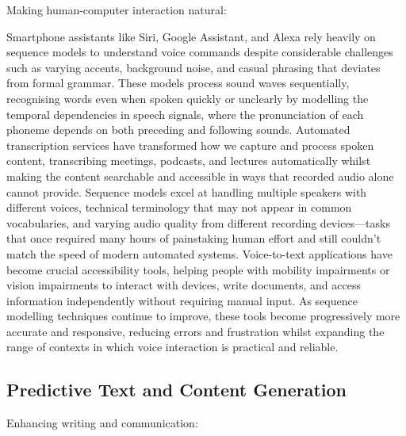 Making human-computer interaction natural:

Smartphone assistants like Siri, Google Assistant, and Alexa rely heavily on sequence models to understand voice commands despite considerable challenges such as varying accents, background noise, and casual phrasing that deviates from formal grammar. These models process sound waves sequentially, recognising words even when spoken quickly or unclearly by modelling the temporal dependencies in speech signals, where the pronunciation of each phoneme depends on both preceding and following sounds. Automated transcription services have transformed how we capture and process spoken content, transcribing meetings, podcasts, and lectures automatically whilst making the content searchable and accessible in ways that recorded audio alone cannot provide. Sequence models excel at handling multiple speakers with different voices, technical terminology that may not appear in common vocabularies, and varying audio quality from different recording devices—tasks that once required many hours of painstaking human effort and still couldn't match the speed of modern automated systems. Voice-to-text applications have become crucial accessibility tools, helping people with mobility impairments or vision impairments to interact with devices, write documents, and access information independently without requiring manual input. As sequence modelling techniques continue to improve, these tools become progressively more accurate and responsive, reducing errors and frustration whilst expanding the range of contexts in which voice interaction is practical and reliable.

\subsection{Predictive Text and Content Generation}

Enhancing writing and communication:

